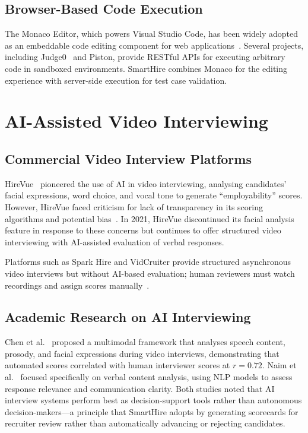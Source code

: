 \subsection{Browser-Based Code Execution}

The Monaco Editor, which powers Visual Studio Code, has been widely adopted as an embeddable code editing component for web applications~\cite{monaco2024}. Several projects, including Judge0~\cite{judge0} and Piston, provide RESTful APIs for executing arbitrary code in sandboxed environments. SmartHire combines Monaco for the editing experience with server-side execution for test case validation.

\section{AI-Assisted Video Interviewing}
\label{sec:video-review}

\subsection{Commercial Video Interview Platforms}

HireVue~\cite{hirevue2024} pioneered the use of AI in video interviewing, analysing candidates' facial expressions, word choice, and vocal tone to generate ``employability'' scores. However, HireVue faced criticism for lack of transparency in its scoring algorithms and potential bias~\cite{harwell2019}. In 2021, HireVue discontinued its facial analysis feature in response to these concerns but continues to offer structured video interviewing with AI-assisted evaluation of verbal responses.

Platforms such as Spark Hire and VidCruiter provide structured asynchronous video interviews but without AI-based evaluation; human reviewers must watch recordings and assign scores manually~\cite{sparkhire2024}.

\subsection{Academic Research on AI Interviewing}

Chen et al.~\cite{chen2022} proposed a multimodal framework that analyses speech content, prosody, and facial expressions during video interviews, demonstrating that automated scores correlated with human interviewer scores at $r = 0.72$. Naim et al.~\cite{naim2018} focused specifically on verbal content analysis, using NLP models to assess response relevance and communication clarity. Both studies noted that AI interview systems perform best as decision-support tools rather than autonomous decision-makers---a principle that SmartHire adopts by generating scorecards for recruiter review rather than automatically advancing or rejecting candidates.


